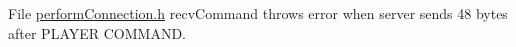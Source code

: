 
\begin{DoxyRefList}
\item[File \mbox{\hyperlink{performConnection_8h}{perform\+Connection.h}} ]\label{bug__bug000001}%
%
recv\+Command throws error when server sends 48 bytes after PLAYER COMMAND. 
\end{DoxyRefList}